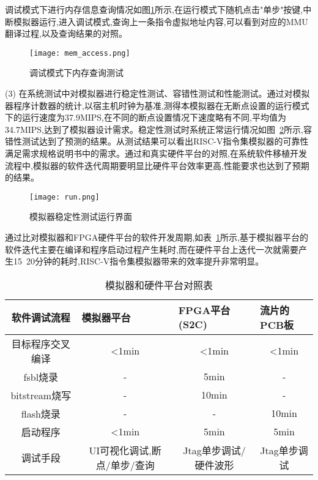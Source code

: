 调试模式下进行内存信息查询情况如图\ref{fig:mem_access}所示,在运行模式下随机点击"单步"按键,中断模拟器运行,进入调试模式,查询上一条指令虚拟地址内容,可以看到对应的MMU翻译过程,以及查询结果的对照。
\begin{figure}[H]
  \centering
  \texttt{[image: mem\_access.png]}
  \caption{调试模式下内存查询测试}
  \label{fig:mem_access}
\end{figure}


(3) 在系统测试中对模拟器进行稳定性测试、容错性测试和性能测试。通过对模拟器程序计数器的统计,以宿主机时钟为基准,测得本模拟器在无断点设置的运行模式下的运行速度为37.9MIPS,在不同的断点设置情况下速度略有不同,平均值为34.7MIPS,达到了模拟器设计需求。稳定性测试时系统正常运行情况如图~\ref{fig:run}所示,容错性测试达到了预测的结果。从测试结果可以看出RISC-V指令集模拟器的可靠性满足需求规格说明书中的需求。通过和真实硬件平台的对照,在系统软件移植开发流程中,模拟器的软件迭代周期要明显比硬件平台效率更高,性能要求也达到了预期的结果。 
\begin{figure}[h]
  \centering
  \texttt{[image: run.png]}
  \caption{模拟器稳定性测试运行界面}
  \label{fig:run}
\end{figure}

\clearpage
通过比对模拟器和FPGA硬件平台的软件开发周期,如表~\ref{tab:cmp}所示,基于模拟器平台的软件迭代主要在编译和程序启动过程产生耗时,而在硬件平台上迭代一次就需要产生15~20分钟的耗时,RISC-V指令集模拟器带来的效率提升非常明显。
\begin{table}[h]
  \centering
  \caption{模拟器和硬件平台对照表}
  \label{tab:cmp}
  \renewcommand\arraystretch{1.2}
  \renewcommand\arraystretch{1.1}
  \begin{tabular}{cccc}
    \toprule
    \multicolumn{1}{c}{软件调试流程} & \multicolumn{1}{l}{模拟器平台} & \multicolumn{1}{l}{FPGA平台(S2C)} &\multicolumn{1}{l}{流片的PCB板}\\
    \midrule
目标程序交叉编译	& \multicolumn{1}{m{3cm}}{<1min} & \multicolumn{1}{m{3cm}}{<1min} & \multicolumn{1}{m{3cm}}{<1min}\\
\hline
fsbl烧录	& \multicolumn{1}{m{3cm}}{-} & \multicolumn{1}{m{3cm}}{5min} & \multicolumn{1}{m{3cm}}{-}\\
\hline
bitstream烧写	& \multicolumn{1}{m{3cm}}{-} & \multicolumn{1}{m{3cm}}{10min} & \multicolumn{1}{m{3cm}}{-}\\
\hline
flash烧录	& \multicolumn{1}{m{3cm}}{-} & \multicolumn{1}{m{3cm}}{-} & \multicolumn{1}{m{3cm}}{10min}\\
\hline
启动程序	& \multicolumn{1}{m{3cm}}{<1min} & \multicolumn{1}{m{3cm}}{5min} & \multicolumn{1}{m{3cm}}{5min}\\
\hline
调试手段	& \multicolumn{1}{m{3cm}}{UI可视化调试,断点/单步/查询} & \multicolumn{1}{m{3cm}}{Jtag单步调试/硬件波形} & \multicolumn{1}{m{3cm}}{Jtag单步调试}\\
    \bottomrule
  \end{tabular}
\end{table}


